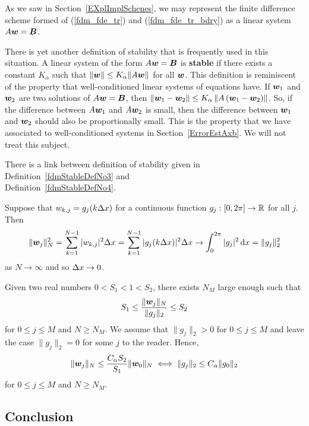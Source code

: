 \begin{rmk}
As we saw in Section~\ref{EXplImplSchenes}, we may represent the
finite difference scheme formed of (\ref{fdm_fde_tr}) and
(\ref{fdm_fde_tr_bdry}) as a linear system $A\bm{w} = \bm{B}$.

There is yet another definition of stability that is frequently used in
this situation.  A linear system of the form $A \bm{w} = \bm{B}$ is
{\bfseries stable} if there
exists a constant $K_\alpha$ such that
$\| \bm{w} \| \leq K_\alpha \| A \bm{w}\|$
for all $\bm{w}$.  This definition is reminiscent of the property
that well-conditioned linear systems of equations have.  If $\bm{w}_1$
and $\bm{w}_2$ are two solutions of $A \bm{w} = \bm{B}$, then
$\displaystyle \left\| \bm{w}_1- \bm{w}_2 \right\| \leq
K_\alpha \left\| A \left(\bm{w}_1 - \bm{w}_2\right)\right\|$.  So, if the
difference between $A \bm{w}_1$ and $A \bm{w}_2$ is small, then the
difference between $\bm{w}_1$ and $\bm{w}_2$ should also be
proportionally small.  This is the property that we have associated to
well-conditioned systems in Section~\ref{ErrorEstAxb}.  We will not
treat this subject.
\end{rmk}

\begin{rmk}
There is a link between definition of stability given in
Definition~\ref{fdmStableDefNo3} and \\
Definition~\ref{fdmStableDefNo4}.

Suppose that $w_{k,j} = g_j(k \Delta{x})$ for a continuous function
$g_j:[0,2\pi]\to \mathbb{R}$ for all $j$.  Then
\[
 \|\bm{w}_j\|_N^2 = \sum_{k=1}^{N-1} |w_{k,j}|^2 \Delta{x}
= \sum_{k=1}^{N-1} |g_j(k\Delta{x})|^2 \Delta{x}
\to \int_0^{2\pi} |g_j|^2 \,\mathrm{d}x = \|g_j\|_2^2
\]
as $N \to \infty$ and so $\Delta{x} \to 0$.

Given two real numbers $0 < S_1 < 1 < S_2$, there exists $N_M$ large
enough such that
\[
  S_1 \leq \frac{\|\bm{w}_j\|_N}{\|g_j\|_2} \leq S_2
\]
for $0\leq j \leq M$ and $N \geq N_M$.  We assume that
$\|g_j\|_2 >0$ for $0 \leq j \leq M$ and leave the case
$\|g_j\|_2 = 0$ for some $j$ to the reader.  Hence,
\[
\|\bm{w}_j\|_N \leq \frac{C_\alpha S_2}{S_1} \|\bm{w}_0\|_N
\iff \|g_j\|_2 \leq C_\alpha \|g_0\|_2
\]
for $0\leq j \leq M$ and $N \geq N_M$.
\end{rmk}

\subsection{Conclusion}

